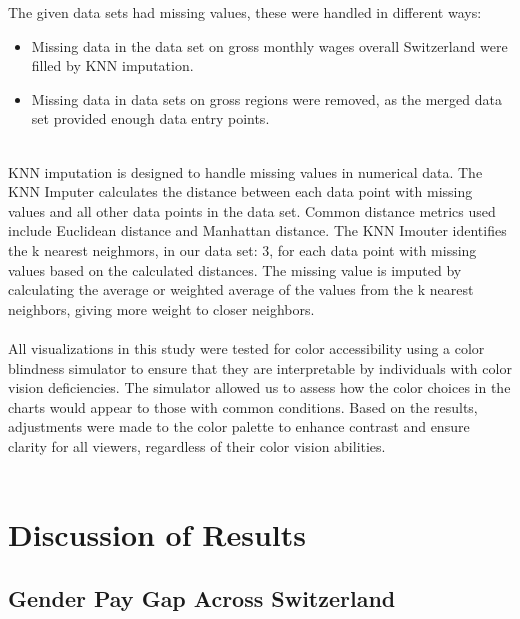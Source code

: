 \documentclass{article}
\begin{document}
The given data sets had missing values, these were handled in different ways: 
\begin{itemize}
        \item Missing data in the data set on gross monthly wages overall Switzerland were filled by KNN imputation.
        \item Missing data in data sets on gross regions were removed, as the merged data set provided enough data entry points. 
\end{itemize}
\\
KNN imputation is designed to handle missing values in numerical data. The KNN Imputer calculates the distance between each data point with missing values and all other data points in the data set. Common distance metrics used include Euclidean distance and Manhattan distance. The KNN Imouter identifies the k nearest neighmors, in our data set: 3, for each data point with missing values based on the calculated distances. The missing value is imputed by calculating the average or weighted average of the values from the k nearest neighbors, giving more weight to closer neighbors. \\

\\
All visualizations in this study were tested for color accessibility using a color blindness simulator to ensure that they are interpretable by individuals with color vision deficiencies. The simulator allowed us to assess how the color choices in the charts would appear to those with common conditions. Based on the results, adjustments were made to the color palette to enhance contrast and ensure clarity for all viewers, regardless of their color vision abilities.\cite{3}\\
\\
\section{Discussion of Results}

\subsection{Gender Pay Gap Across Switzerland}
\end{document}
